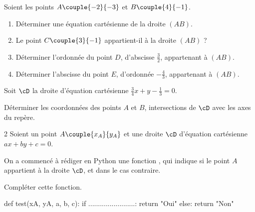 \exo

Soient les points $A\couple{-2}{-3}$ et $B\couple{4}{-1}$.
\begin{enumerate}
\item Déterminer une équation cartésienne de la droite $(AB)$.
\item Le point $C\couple{3}{-1}$ appartient-il à la droite $(AB)$ ?
\item Déterminer l'ordonnée du point $D$, d'abscisse $\frac{3}{2}$, appartenant à $(AB)$.
\item Déterminer l'abscisse du point $E$, d'ordonnée $-\frac{4}{3}$, appartenant à $(AB)$.
\end{enumerate}

\exo

Soit $\cD$ la droite d'équation cartésienne $\frac{3}{4}x+y-\frac{1}{3}=0$.

Déterminer les coordonnées des points $A$ et $B$, intersections de $\cD$ avec les axes du repère.

\exo

\vspace{-12pt}
\setlength{\columnsep}{1cm}
\setlength{\columnseprule}{0pt}
\begin{multicols}{2}
\raggedcolumns
Soient un point $A\couple{x_A}{y_A}$ et une droite $\cD$ d'équation cartésienne $ax+by+c=0$.

On a commencé à rédiger en Python une fonction , qui indique  si le point $A$ appartient à la droite $\cD$, et  dans le cas contraire.

Compléter cette fonction.

\begin{pythoncodenumligne}
def test(xA, yA, a, b, c):
    if ........................:
        return "Oui"
    else:
        return "Non"
\end{pythoncodenumligne}
\end{multicols}
\vspace{-6pt}

\exo

